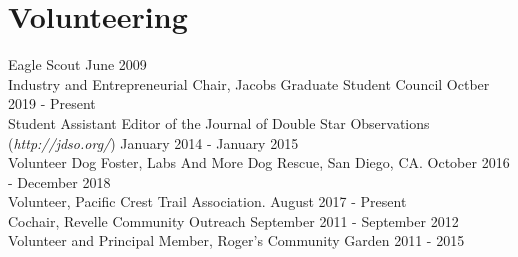 \section{Volunteering}

Eagle Scout
    \hfill June 2009\\
Industry and Entrepreneurial Chair, Jacobs Graduate Student Council
    \hfill Octber 2019 - Present\\
Student Assistant Editor of the Journal of Double Star Observations ({\sl http://jdso.org/})
    \hfill January 2014 - January 2015\\
Volunteer Dog Foster, Labs And More Dog Rescue, San Diego, CA. 
    \hfill  October 2016 - December 2018\\
Volunteer, Pacific Crest Trail Association. 
    \hfill  August 2017 - Present\\
Cochair, Revelle Community Outreach 
    \hfill September 2011 - September 2012\\
Volunteer and Principal Member, Roger’s Community Garden 
    \hfill  2011 - 2015
